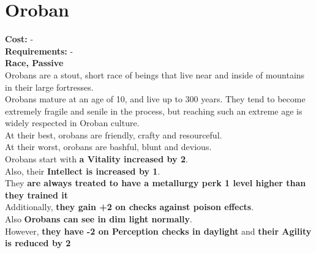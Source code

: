 \section{Oroban}
\textbf{Cost:} -\\
\textbf{Requirements:} -\\
\textbf{Race, Passive}\\
Orobans are a stout, short race of beings that live near and inside of mountains in their large fortresses.\\
Orobans mature at an age of 10, and live up to 300 years. They tend to become extremely fragile and senile in the process, but reaching such an extreme age is widely respected in Oroban culture.\\
At their best, orobans are friendly, crafty and resourceful.\\
At their worst, orobans are bashful, blunt and devious.\\
Orobans start with \textbf{a Vitality increased by 2}.\\
Also, their \textbf{Intellect is increased by 1}.\\
They \textbf{are always treated to have a metallurgy perk 1 level higher than they trained it}\\
Additionally, \textbf{they gain +2 on checks against poison effects}.\\
Also \textbf{Orobans can see in dim light normally}.\\
However, \textbf{they have -2 on Perception checks in daylight} and \textbf{their Agility is reduced by 2}\\
